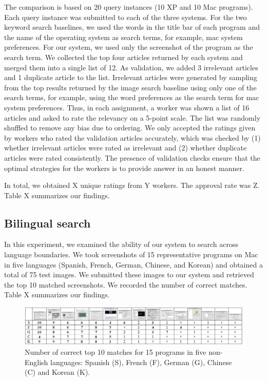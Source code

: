 \documentclass{www2010-submission}
\begin{document}
The comparison is based on 20 query instances (10 XP and 10 Mac
programs). Each query instance was submitted to each of the three
systems. For the two keyword search baselines, we used the words in
the title bar of each program and the name of the operating system as
search terms, for example, mac system preferences. For our system, we
used only the screenshot of the program as the search term. We
collected the top four articles returned by each system and merged
them into a single list of 12. As validation, we added 3 irrelevant
articles and 1 duplicate article to the list. Irrelevant articles were
generated by sampling from the top results returned by the image
search baseline using only one of the search terms, for example, using
the word preferences as the search term for mac system
preferences. Thus, in each assignment, a worker was shown a list of 16
articles and asked to rate the relevancy on a 5-point scale. The list
was randomly shuffled to remove any bias due to ordering.  We only
accepted the ratings given by workers who rated the validation
articles accurately, which was checked by (1) whether irrelevant
articles were rated as irrelevant and (2) whether duplicate articles
were rated consistently. The presence of validation checks
ensure that the optimal strategies for the workers is to
provide answer in an honest manner.

In total, we obtained X unique ratings from Y workers. The 
approval rate was Z. Table X summarizes our findings. 

\subsection{Bilingual search}

In this experiment, we examined the ability of our system to search
across language boundaries. We took screenshots of 15 representative
programs on Mac in five languages (Spanish, French, German,
Chinese, and Korean) and obtained a total of 75 test
images.  We submitted these images to our 
system and retrieved the top 10 matched screenshots. We recorded
the number of correct matches. Table X summarizes
our findings.

\begin{figure}
\includegraphics[width=2\columnwidth]{figure/bilingual_search.png}
\caption{Number of correct top 10 matches for 15 programs in five non-English
languages: Spanish (S), French (F), German (G), Chinese (C) and Korean (K).}
\end{figure}
\end{document}
